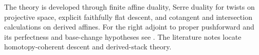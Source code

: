 \documentclass[11pt,oneside,openany]{book}
\theoremstyle{definition}
\theoremstyle{remark}
\begin{document}
The theory is developed through finite affine duality, Serre duality
for twists on projective space, explicit faithfully flat descent, and
cotangent and intersection calculations on derived affines. For the
right adjoint to proper pushforward and its perfectness and base-change
hypotheses see \cite[\S\S12--13]{st-duality}. The literature notes
locate homotopy-coherent descent and derived-stack theory.

\mainmatter







\backmatter

\end{document}
